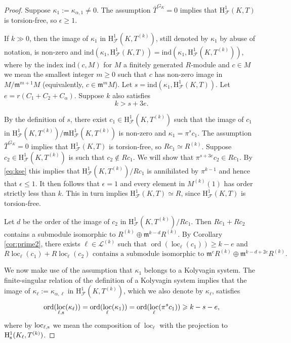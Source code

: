 \documentclass[10pt]{amsart}
\numberwithin{equation}{section}
\theoremstyle{definition}
\theoremstyle{remark}
\newcommand{\rH}{\mathrm{H}}
\newcommand{\fm}{\mathfrak{m}}
\DeclareMathOperator{\loc}{loc}
\DeclareMathOperator{\ord}{ord}
\newcommand{\CF}{\mathcal{F}}
\newcommand{\CL}{\mathscr{L}}
\newcommand{\kap}{\kappa}
\newcommand{\ind}{\mathrm{ind}}
\begin{document}
\begin{proof} 
Suppose $\kap_1:=\kap_{\alpha,1} \neq 0$.
The assumption $\bar{T}^{G_K}=0$ implies that $\rH^1_{\CF}(K,T)$ is torsion-free, so $\epsilon \geqslant 1$. 

If $k\gg 0$, then the image of $\kap_1$ in $\rH^1_{\CF}(K,T^{(k)})$, still denoted by $\kap_1$ by abuse of notation, 
is non-zero and $\ind(\kap_1, \rH^1_{\CF}(K,T))=\ind(\kap_1, \rH^1_{\CF}(K,T^{(k)}))$, where by the index $\ind(c,M)$
for $M$ a finitely generated $R$-module and $c\in M$ we mean the smallest integer $m\geqslant 0$ such that $c$ has non-zero
image in $M/\fm^{m+1}M$ (equivalently, $c\in \fm^mM$).  
Let $s= \ind(\kap_1, \rH^1_{\CF}(K,T))$. Let $e= r(C_1+C_2+C_\alpha)$. Suppose $k$ also satisfies
\begin{equation}\label{eq:kse}
k > s + 3e.
\end{equation}

By the definition of $s$, there exist $c_1\in \rH^1_{\CF}(K,T^{(k)})$ such that  
the image of $c_1$ in $\rH^1_{\CF}(K,T^{(k)})/\fm \rH^1_{\CF}(K,T^{(k)})$ is non-zero and $\kap_1 = \pi^{s}c_1$.
The assumption $\bar{T}^{G_K}=0$ implies that $\rH^1_{\CF}(K,T)$ is torsion-free, so $Rc_1 \simeq R^{(k)}$.
Suppose $c_2\in \rH^1_{\CF}(K,T^{(k)})$ is such that $c_2\not \in R c_1$. We will show that 
$\pi^{s+3e} c_2 \in Rc_1$. By \eqref{eq:kse} this implies
that $\rH^1_{\CF}(K,T^{(k)})/Rc_1$ is annihilated by $\pi^{k-1}$ and hence that $\epsilon \leqslant 1$.
It then follows that $\epsilon  = 1$ and every element in $M^{(k)}(1)$ has order strictly less than $k$.
This in turn implies $\rH^1_{\CF}(K,T)\simeq R$, since $\rH^1_{\CF}(K,T)$ is torsion-free. 

Let $d$ be the order of the image of $c_2$ in $\rH^1_{\CF}(K,T^{(k)})/Rc_1$. Then
$Rc_1 + Rc_2$ contains a submodule isomorphic to $R^{(k)} \oplus \fm^{k-d}R^{(k)}$.
By Corollary \ref{cor:prime2}, there exists $\ell\in \CL^{(k)}$ such that 
$\ord(\loc_\ell(c_1)) \geqslant k-e$ and 
\begin{equation}\label{eq:rk1}
\text{$R\loc_\ell(c_1) + R\loc_\ell(c_2)$ contains a submodule isomorphic to $\fm^{e}R^{(k)}\oplus \fm^{k-d+2e}R^{(k)}$.}
\end{equation}


We now make use of the assumption that $\kap_1$ belongs to a Kolyvagin system. 
The finite-singular relation of the definition of a Kolyvagin system implies that the image of $\kap_\ell:=\kappa_{\alpha,\ell}$ in $\rH^1_{\CF}(K,T^{(k)})$,
which we also denote by $\kap_\ell$, satisfies
\begin{equation}\label{eq:rk2}
\ord(\loc_{\ell,{\rm s}}(\kap_\ell)) = \ord(\loc_\ell(\kap_1)) = \ord(\loc_\ell(\pi^{s}c_1)) \geqslant k-s-e,
\end{equation}
where by $\loc_{\ell,{\rm s}}$ we mean the composition of $\loc_\ell$ with the projection to 
$\rH^1_{\rm s}(K_\ell, T^{(k)})$. 




\end{proof}
\end{document}
